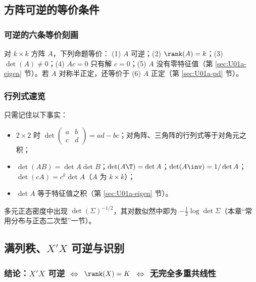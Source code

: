 \subsection{方阵可逆的等价条件}

\subsubsection{可逆的六条等价刻画}\label{ss:U01a-invequiv}

\begin{thm}[可逆的等价刻画]\label{thm:U01a-invequiv}
对 $k\times k$ 方阵 $A$，下列命题等价：
(1) $A$ 可逆；(2) $\rank(A)=k$；(3) $\det(A)\neq0$；(4) $Ac=0$ 只有解 $c=0$；(5) $A$ 没有零特征值（第 \ref{sec:U01a-eigen} 节）。若 $A$ 对称半正定，还等价于 (6) $A$ 正定（第 \ref{sec:U01a-pd} 节）。
\end{thm}

\subsubsection{行列式速览}

只需记住以下事实：
\begin{itemize}
  \item $2\times2$ 时 $\det\begin{pmatrix}a&b\\c&d\end{pmatrix}=ad-bc$；对角阵、三角阵的行列式等于对角元之积；
  \item $\det(AB)=\det A\det B$；$\det(A\T)=\det A$；$\det(A\inv)=1/\det A$；$\det(cA)=c^k\det A$（$A$ 为 $k\times k$）；
  \item $\det A$ 等于特征值之积（第 \ref{sec:U01a-eigen} 节）。
\end{itemize}
多元正态密度中出现 $\det(\Sigma)^{-1/2}$，其对数似然中即为 $-\frac12\log\det\Sigma$（本章“常用分布与正态二次型”一节）。

\subsection{满列秩、\texorpdfstring{$X'X$}{X'X} 可逆与识别}

\subsubsection{结论：\texorpdfstring{$X'X$}{X'X} 可逆 \texorpdfstring{$\iff$}{iff} \texorpdfstring{$\rank(X)=K$}{rank(X)=K} \texorpdfstring{$\iff$}{iff} 无完全多重共线性}

